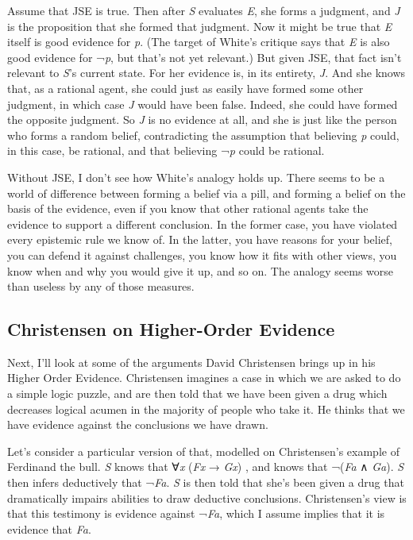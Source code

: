 \documentclass[
  11pt,
  letterpaper,
  DIV=11,
  numbers=noendperiod,
  twoside]{scrartcl}
\begin{document}
Assume that JSE is true. Then after \emph{S} evaluates \emph{E}, she
forms a judgment, and \emph{J} is the proposition that she formed that
judgment. Now it might be true that \emph{E} itself is good evidence for
\emph{p}. (The target of White's critique says that \emph{E} is also
good evidence for ¬\emph{p}, but that's not yet relevant.) But given
JSE, that fact isn't relevant to \emph{S}'s current state. For her
evidence is, in its entirety, \emph{J}. And she knows that, as a
rational agent, she could just as easily have formed some other
judgment, in which case \emph{J} would have been false. Indeed, she
could have formed the opposite judgment. So \emph{J} is no evidence at
all, and she is just like the person who forms a random belief,
contradicting the assumption that believing \emph{p} could, in this
case, be rational, and that believing ¬\emph{p} could be rational.

Without JSE, I don't see how White's analogy holds up. There seems to be
a world of difference between forming a belief via a pill, and forming a
belief on the basis of the evidence, even if you know that other
rational agents take the evidence to support a different conclusion. In
the former case, you have violated every epistemic rule we know of. In
the latter, you have reasons for your belief, you can defend it against
challenges, you know how it fits with other views, you know when and why
you would give it up, and so on. The analogy seems worse than useless by
any of those measures.

\subsection{Christensen on Higher-Order
Evidence}\label{christensen-on-higher-order-evidence}

Next, I'll look at some of the arguments David Christensen brings up in
his Higher Order Evidence. Christensen imagines a case in which we are
asked to do a simple logic puzzle, and are then told that we have been
given a drug which decreases logical acumen in the majority of people
who take it. He thinks that we have evidence against the conclusions we
have drawn.

Let's consider a particular version of that, modelled on Christensen's
example of Ferdinand the bull. \emph{S} knows that ∀\emph{x} (\emph{Fx}
→ \emph{Gx}) , and knows that ¬(\emph{Fa} ∧ \emph{Ga}). \emph{S} then
infers deductively that ¬\emph{Fa}. \emph{S} is then told that she's
been given a drug that dramatically impairs abilities to draw deductive
conclusions. Christensen's view is that this testimony is evidence
against ¬\emph{Fa}, which I assume implies that it is evidence that
\emph{Fa}.
\end{document}
